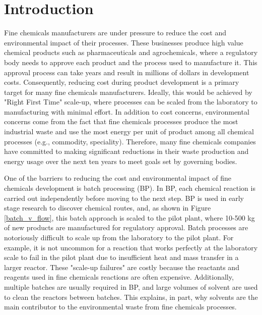 \chapter{Introduction}\label{ch:introduction}


Fine chemicals manufacturers are under pressure to reduce the cost and environmental impact of their processes. These businesses produce high value chemical products such as pharmaceuticals and agrochemicals, where a regulatory body needs to approve each product and the process used to manufacture it. This approval process can take years and result in millions of dollars in development costs.\cite{Prasad2017} Consequently, reducing cost during product development is a primary target for many fine chemicals manufacturers. Ideally, this would be achieved by "Right First Time" scale-up, where processes can be scaled from the laboratory to manufacturing with minimal effort.\cite{Poechlauer2013} In addition to cost concerns, environmental concerns come from the fact that fine chemicals processes produce the most industrial waste and use the most energy per unit of product among all chemical processes (e.g., commodity, speciality).\cite{Sheldon2018} Therefore, many fine chemicals companies have committed to making significant reductions in their waste production and energy usage over the next ten years to meet goals set by governing bodies.\cite{BASF2020}

One of the barriers to reducing the cost and environmental impact of fine chemicals development is batch processing (BP).  In BP, each chemical reaction is carried out independently before moving to the next step. BP is used in early stage research to discover chemical routes, and, as shown in Figure \ref{batch_v_flow}, this batch approach is scaled to the pilot plant, where 10-500 kg of new products are manufactured for regulatory approval. Batch processes are notoriously difficult to scale up from the laboratory to the pilot plant. For example, it is not uncommon for a reaction that works perfectly at the laboratory scale to fail in the pilot plant due to insufficient heat and mass transfer in a larger reactor. These "scale-up failures" are costly because the reactants and reagents used in fine chemicals reactions are often expensive. Additionally, multiple batches are usually required in BP, and large volumes of solvent are used to clean the reactors between batches.\cite{Lee2016, Sheldon2018} This explains, in part, why solvents are the main contributor to the environmental waste from fine chemicals processes.\cite{Rogers2019}

